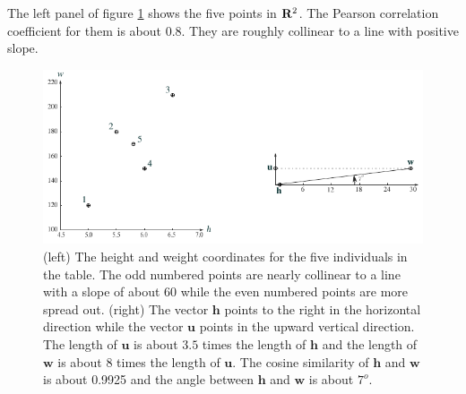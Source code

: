    The left panel of figure \ref{twogeoms} shows the five points in ${\bf R}^2$.
The Pearson correlation coefficient for them is about $0.8$.  They are roughly 
collinear to a line with positive slope.

\begin{figure}[h]
\centering
\includegraphics[scale=1.25]{./images/heightWeight.pdf}
\caption{(left) The height and weight coordinates for the five individuals in
the table.  The odd numbered points are nearly collinear to a line with a
slope of about $60$ while the even numbered points are more spread out.
(right)  The vector $\mathbf{h}$ points to the right in the horizontal 
direction while the vector $\mathbf{u}$ points in the upward vertical 
direction.  The length of $\mathbf{u}$ is about $3.5$ times the length of 
$\mathbf{h}$ and the length of $\mathbf{w}$ is about $8$ times the length of
$\mathbf{u}$.  The cosine similarity of $\mathbf{h}$ and $\mathbf{w}$ is about 
0.9925 and the angle between $\mathbf{h}$ and $\mathbf{w}$ is about $7^o$.} 
\label{twogeoms}
\end{figure}

